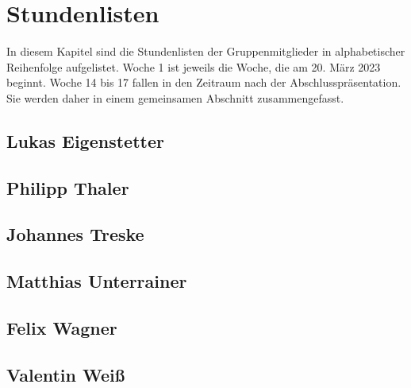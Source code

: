 \documentclass[12pt,a4paper,bibliography=totocnumbered,listof=totocnumbered]{article}
\begin{document}
\newpage
\section{Stundenlisten}
In diesem Kapitel sind die Stundenlisten der Gruppenmitglieder in alphabetischer Reihenfolge aufgelistet.
Woche 1 ist jeweils die Woche, die am 20. März 2023 beginnt.
Woche 14 bis 17 fallen in den Zeitraum nach der Abschlusspräsentation.
Sie werden daher in einem gemeinsamen Abschnitt zusammengefasst.

\newpage
\subsection{Lukas Eigenstetter}


\subsection{Philipp Thaler}


\subsection{Johannes Treske}


\subsection{Matthias Unterrainer}


\subsection{Felix Wagner}


\subsection{Valentin Weiß}

\end{document}
